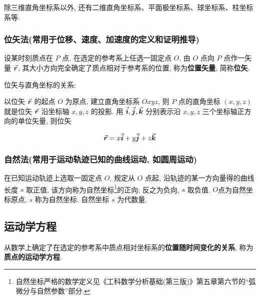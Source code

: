 除三维直角坐标系以外, 还有二维直角坐标系、平面极坐标系、球坐标系、柱坐标系等. 

\subsubsection{位矢法(常用于位移、速度、加速度的定义和证明推导)}

设某时刻质点在 $P$ 点, 在选定的参考系上任选一固定点 $O$, 由 $O$ 点向 $P$ 点作一矢量 $\va*{r}$, 其大小方向完全确定了质点相对于参考系的位置, 称为\textbf{位置矢量}, 简称\textbf{位矢}. 

位矢与直角坐标的关系: 

以位矢 $\va*{r}$ 的起点 $O$ 为原点, 建立直角坐标系 $Oxyz$, 则 $P$ 点的直角坐标 $(x, y, z)$ 就是位矢 $\va*{r}$ 沿坐标轴 $x, y, z$ 的投影. 用 $\va*{i}, \va*{j}, \va*{k}$ 分别表示沿 $x, y, z$ 三个坐标轴正方向的单位矢量, 则位矢

\begin{equation}
	\va*{r} = x \va*{i} + y \va*{j} + z \va*{k} \label{C1-eq1}
\end{equation}

\subsubsection{自然法(常用于运动轨迹已知的曲线运动, 如圆周运动)}

在已知运动轨迹上选取一固定点 $O$, 规定从 $O$ 点起, 沿轨迹的某一方向量得的曲线长度 $s$ 取正值, 该方向称为自然坐标\footnote{自然坐标严格的数学定义见《工科数学分析基础(第三版)》第五章第六节的“弧微分与自然参数”部分. }的正向; 反之为负向, $s$ 取负值. $O$点为自然坐标原点, $s$ 称为自然坐标. 自然坐标 $s$ 为代数量. 

\subsection{运动学方程}

从数学上确定了在选定的参考系中质点相对坐标系的\textbf{位置随时间变化的关系}, 称为\textbf{质点的运动学方程}. 

\vskip 0.3cm

